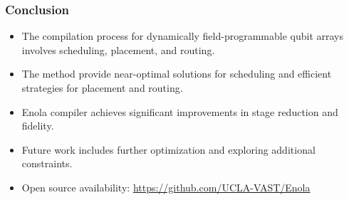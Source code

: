 \documentclass[18 pt]{beamer}
\begin{document}
\begin{frame}
    \frametitle{Conclusion}
    \begin{itemize}
        \item The compilation process for dynamically field-programmable qubit arrays involves scheduling, placement, and routing.
        \item The method provide near-optimal solutions for scheduling and efficient strategies for placement and routing.
        \item Enola compiler achieves significant improvements in stage reduction and fidelity.
        \item Future work includes further optimization and exploring additional constraints.
        \item Open source availability: \url{https://github.com/UCLA-VAST/Enola}
    \end{itemize}
\end{frame}
\end{document}
